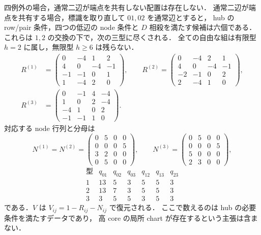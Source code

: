 \begin{proposition}
\label{kf17:complete-hub-list}
四例外の場合，通常二辺が端点を共有しない配置は存在しない．
通常二辺が端点を共有する場合，標識を取り直して $01,02$ を通常辺とすると，
hub の row/pair 条件，四つの低辺の node 条件と $D$ 相殺を満たす候補は六個である．
これらは $1,2$ の交換の下で，次の三型に尽くされる．
全ての自由な組は有限型 $h=2$ に属し，無限型 $h\ge6$ は残らない．
\[
\begin{split}
 R^{(1)}&=\begin{pmatrix}
 0&-4&1&2\\4&0&-4&-1\\-1&-1&0&1\\1&-4&2&0
 \end{pmatrix},\qquad
 R^{(2)}=\begin{pmatrix}
 0&-4&2&1\\4&0&-4&-1\\-2&-1&0&2\\2&-4&1&0
 \end{pmatrix},\\[.4em]
 R^{(3)}&=\begin{pmatrix}
 0&-1&4&-4\\1&0&2&-4\\-4&1&0&2\\-1&-1&1&0
 \end{pmatrix}.
\end{split}
\]
対応する node 行列と分母は
\[
 N^{(1)}=N^{(2)}=\begin{pmatrix}
 0&5&0&0\\0&0&0&5\\3&2&0&0\\0&5&0&0
 \end{pmatrix},\qquad
 N^{(3)}=\begin{pmatrix}
 0&5&0&0\\0&0&0&5\\5&0&0&0\\2&3&0&0
 \end{pmatrix},
\]
\[
\begin{array}{c|rrrrrr}
 \text{型}&q_{01}&q_{02}&q_{03}&q_{12}&q_{13}&q_{23}\\\hline
 1&13&5&3&5&5&3\\
 2&13&7&3&5&5&3\\
 3&3&5&5&3&5&3
\end{array}
\]
である．$V$ は $V_{ij}=1-R_{ij}-N_{ij}$ で復元される．
ここで数えるのは hub の必要条件を満たすデータであり，
高 core の局所 chart が存在するという主張は含まない．
\end{proposition}

